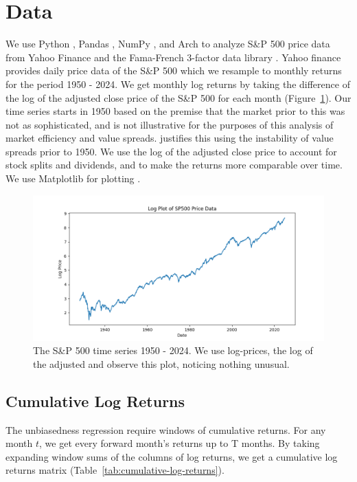 \section{Data}
\label{sec:data}

We use Python \citep{python3}, Pandas \citep{reback2020pandas}, NumPy \citep{harris2020array}, and Arch \citep{sheppard2024arch} to analyze S\&P 500 price data from Yahoo Finance \citep{yahoo_finance_gspc} and the Fama-French 3-factor data library \citep{french_website}.
Yahoo finance provides daily price data of the S\&P 500 which we resample to monthly returns for the period 1950 - 2024. We get monthly log returns by taking the
difference of the log of the adjusted close price of the S\&P 500 for each month (Figure~\ref{fig:sp500-returns}). Our time series starts in 1950
based on the premise that the market prior to this was not as sophisticated, and is not illustrative for the purposes of this analysis of market efficiency and value spreads. \citep{asness_2024} justifies this using the 
instability of value spreads prior to 1950. We use the log of the adjusted close price to account for stock splits and dividends, and to make the returns more comparable over time.
We use Matplotlib for plotting \citep{Hunter2007}.
\begin{figure}[h!]
    \centering
    \includegraphics[width=1\textwidth]{../figs/SP500 Log Price.png}
    \caption{The S\&P 500 time series 1950 - 2024. We use log-prices, the log of the adjusted and observe this plot, noticing nothing unusual.}
    \label{fig:sp500-returns}
\end{figure}

\subsection{Cumulative Log Returns}

The unbiasedness regression require windows of cumulative returns. For any month $t$, we get every forward month's returns up to T months.
By taking expanding window sums of the columns of log returns, we get a cumulative log returns matrix (Table~\ref{tab:cumulative-log-returns}).

